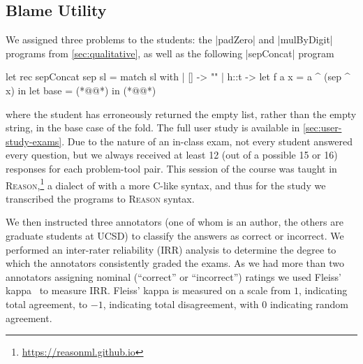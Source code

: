 \subsection{Blame Utility}
\label{sec:user-study}



We assigned three problems to the students: the |padZero| and
|mulByDigit| programs from \autoref{sec:qualitative}, as well as
the following |sepConcat| program
%
\begin{ecode}
  let rec sepConcat sep sl =
    match sl with
    | [] -> ""
    | h::t ->
        let f a x = a ^ (sep ^ x) in
        let base = (*@\hlTree{[]}@*) in
        (*@@*)
\end{ecode}
%
where the student has erroneously returned the empty list, rather than
the empty string, in the base case of the fold.
%
%
The full user study is available in \autoref{sec:user-study-exams}.
%
Due to the nature of an in-class exam, not every student answered every
question, but we always received at least 12 (out of a possible 15 or
16) responses for each problem-tool pair.
%
This session of the course
was taught in \textsc{Reason},\footnote{\url{https://reasonml.github.io}}
a dialect of \ocaml with a more C-like syntax, and thus for the study
we transcribed the programs to \textsc{Reason} syntax.

We then instructed three annotators (one of whom is an author, the others
are graduate students at UCSD) to classify the answers as
correct or incorrect.
%
We performed an inter-rater reliability (IRR) analysis to determine the
degree to which the annotators consistently graded the exams.
%
As we had more than two annotators assigning nominal (``correct'' or
``incorrect'') ratings we used Fleiss' kappa~\cite{Fleiss1971-du} to
measure IRR.\@
%
Fleiss' kappa is measured on a scale from $1$, indicating total
agreement, to $-1$, indicating total disagreement, with $0$ indicating
random agreement.

